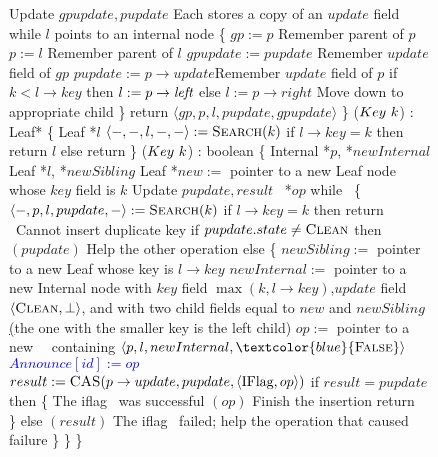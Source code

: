 \begin{figure*}
\begin{code}
		Update $gpupdate, pupdate$ \tabtabcom Each stores a copy of an $update$ field\bl\nlc
		while $l$ points to an internal node \{ \nlc%
		\n         $gp := p$ \tabtabcom Remember parent of $p$\nlc
		$p := l$ \tabtabcom Remember parent of $l$\nlc
		$gpupdate := pupdate$ \tabtabcom Remember $update$ field of $gp$\nlc
		$pupdate := p\rightarrow update$\label{store-pupdate}\tabtabcom Remember $update$ field of $p$\nlc  
		if $k < l\rightarrow key$ then $l:= p\rightarrow \mbox{\it left}$ else $l:=p \rightarrow right$ \label{read-child}\tabtabcom Move down to appropriate child\nlc
		\p \} \nlc
		return $\langle gp, p, l, pupdate, gpupdate \rangle$ \nlc
		\p 
		\}\bl
		\nlc
		($Key\ k$) : Leaf* \{ \nlc
		\n   Leaf *$l$\bl
		\nlc
		$\langle -,-,l,-,-\rangle := \mbox{\sc Search}(k)$\nlc
		if $l\rightarrow key = k$ then return $l$\nlc
		else return \NULL\nlc
		\p
		\}\bl
		\nlc
		($Key\ k$) : boolean \{ \nlc
		\n Internal *$p$, *$newInternal$\nlc 
		Leaf *$l$, *$newSibling$\nlc 
		Leaf *$new :=$ pointer to a new Leaf node whose $key$ field is $k$  \nlc
		Update $pupdate, result$\nlc
		\IFlag\ *$op$\bl\nlc%
		while \TRUE\ \{  \nlc
		\n $\langle -, p, l, pupdate, - \rangle := \mbox{\sc Search}(k)$ \label{ins-search}\nlc
		if $l \rightarrow key = k$ then return \FALSE\ \tabtabcom Cannot insert duplicate key\label{insert-false}\nlc
		if $pupdate.state \neq \mbox{\sc Clean}$ then $(pupdate)$ \tabtabcom Help the other operation \label{ins-help-unclean}\nlc
		else \{\nlc
		\n        $newSibling :=$ pointer to a new Leaf whose key is $l\rightarrow key$\nlc
		$newInternal :=$ pointer to a new Internal node with $key$ field $\max(k, l \rightarrow key)$,\label{create-internal}\ul      
		\n      $update$ field $\langle \mbox{\sc Clean}, \mbox{$\bot$}\rangle$, and with two
		child fields equal to $new$ and $newSibling$\ul 
		(the one with the smaller key is the left child)\nlc
		\p        $op :=$ pointer to a new \IFlag\ \record\  containing $\langle p, l, newInternal, \textcolor{blue}{\FALSE}\rangle$\label{new-IFlag}\nlc
		\textcolor{blue}{$Announce[id] := op$} \label{insert-write-announce} \nlc
		$result := \mbox{\sc CAS}(p\rightarrow update, pupdate, \langle \mbox{IFlag}, op\rangle)$ \label{iflag-cas} \nlc
		if $result = pupdate$ then \{ \tabtabcom The iflag \CASB\ was successful\nlc
		\n            {}$(op)$ \tabtabcom Finish the insertion\label{finish-insert}\nlc
		return \TRUE\ \label{insert-true}\nlc
		\p        \}\nlc 
		else $(result)$ \tabcom The iflag \CASB\ failed; help the operation that caused failure\label{ins-help-after-failure}\nlc
		\p    \}\nlc
		\p\}\nlc 
		\p
		\}\bl
		\nlc
		

\end{code}
\end{figure*}
